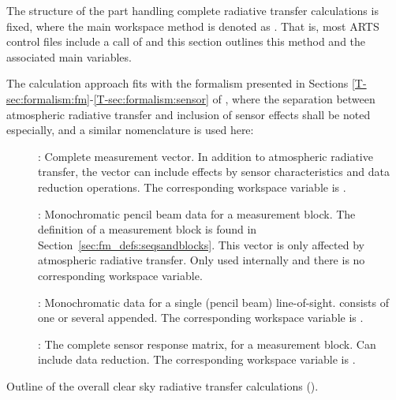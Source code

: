 The structure of the part handling complete radiative transfer calculations is
fixed, where the main workspace method is denoted as . That is,
most ARTS control files include a call of  and this section
outlines this method and the associated main variables.

The calculation approach fits with the formalism presented in Sections
\ref{T-sec:formalism:fm}-\ref{T-sec:formalism:sensor} of \theory, where the
separation between atmospheric radiative transfer and inclusion of sensor
effects shall be noted especially, and a similar nomenclature is used here:
\begin{description}
\item[\MsrVct]: Complete measurement vector. In addition to atmospheric
  radiative transfer, the vector can include effects by sensor characteristics
  and data reduction operations. The corresponding workspace variable is 
  .
\item[]: Monochromatic pencil beam data for a measurement block. The
  definition of a measurement block is found in
  Section~\ref{sec:fm_defs:seqsandblocks}. This vector is only affected by
  atmospheric radiative transfer. Only used internally and there is no
  corresponding workspace variable.
\item[]: Monochromatic data for a single (pencil beam)
  line-of-sight.  consists of one or several  appended.
  The corresponding workspace variable is .
\item[]: The complete sensor response matrix, for a measurement
  block. Can include data reduction. The corresponding workspace variable is
  .
\end{description}
\begin{algorithm}[t]
 \begin{algorithmic}
   \ENDFOR
  \ENDFOR
 \end{algorithmic}
 \caption{Outline of the overall clear sky radiative transfer calculations
   ().}
 \label{alg:fm_defs:yCalc}
\end{algorithm}

